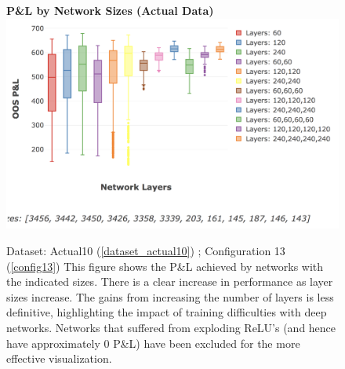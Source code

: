 \documentclass[a4paper,11pt,oneside]{article}
\theoremstyle{plain}
\theoremstyle{definition}
\begin{document}
	\begin{figure}[H]
		\centering 
		\textbf{P\&L by Network Sizes (Actual Data)}
		\includegraphics[scale=0.4]{images/results/8_appendix/actual_pl_box.png} 
		\caption[P\&L By Network Sizes (Actual Data)]{Dataset: Actual10 (\ref{dataset_actual10}) ; Configuration 13 (\ref{config13})
			\newline This figure shows the P\&L achieved by networks with the indicated sizes. There is a clear increase in performance as layer sizes increase. The gains from increasing the number of layers is less definitive, highlighting the impact of training difficulties with deep networks. Networks that suffered from exploding ReLU's (and hence have approximately 0 P\&L) have been excluded for the more effective visualization. }
		\label{figure-results_actual_pl_box}
	\end{figure}
	
\end{document}
